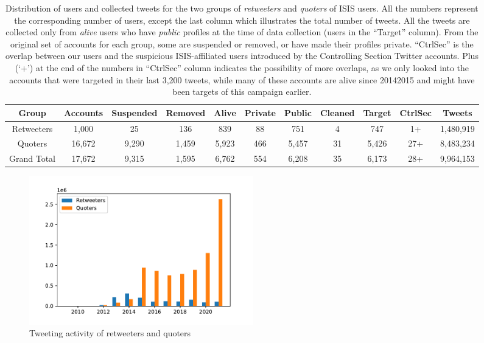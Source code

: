 \documentclass[letterpaper]{article} %
\begin{document}
\begin{table}[ht]
\centering
\begin{tabular}{|c||c|c|c|c|c|c|c|c|c|c|}
 \hline
 Group & Accounts & Suspended & Removed & Alive & Private & Public & Cleaned & Target & CtrlSec & Tweets\\ [0.5ex]
 \hline\hline
  Retweeters & 1,000 & 25 & 136 & 839 & 88 & 751 & 4 & 747 & 1+ & 1,480,919 \\\hline
 Quoters & 16,672 & 9,290 & 1,459 & 5,923 & 466 & 5,457 & 31 & 5,426 & 27+ & 8,483,234\\[0.25ex]\hline
Grand Total & 17,672 & 9,315 & 1,595 & 6,762 & 554 & 6,208 & 35 & 6,173 & 28+ & 9,964,153 \\[0.25ex]\hline
\end{tabular}
\caption{Distribution of users and collected tweets for the two groups of \textit{retweeters} and \textit{quoters} of ISIS users. All the numbers represent the corresponding number of users, except the last column which illustrates the total number of tweets. All the tweets are collected only from \textit{alive} users who have \textit{public} profiles at the time of data collection (users in the ``Target'' column). From the original set of accounts for each group, some are suspended or removed, or have made their profiles private. ``CtrlSec'' is the overlap between our users and the suspicious ISIS-affiliated users introduced by the Controlling Section Twitter accounts. Plus (`+') at the end of the numbers in ``CtrlSec'' column indicates the possibility of more overlaps, as we only looked into the accounts that were targeted in their last 3,200 tweets, while many of these accounts are alive since 20142015 and might have been targets of this campaign earlier.}
\label{table:users}
\end{table}

\begin{figure}[ht]
\includegraphics[width=0.47\textwidth]{img/overall-activity.pdf}
\caption{Tweeting activity of retweeters and quoters}
\label{fig:tweeting-activity}
\end{figure}
\end{document}
